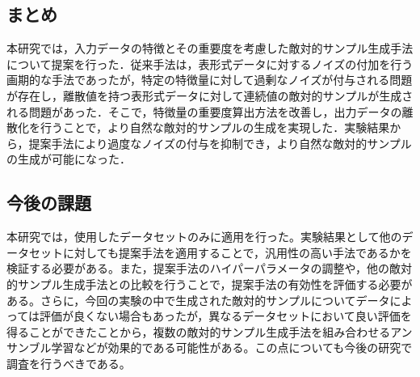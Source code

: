\subsection{まとめ}
本研究では，入力データの特徴とその重要度を考慮した敵対的サンプル生成手法について提案を行った．従来手法は，表形式データに対するノイズの付加を行う画期的な手法であったが，特定の特徴量に対して過剰なノイズが付与される問題が存在し，離散値を持つ表形式データに対して連続値の敵対的サンプルが生成される問題があった．そこで，特徴量の重要度算出方法を改善し，出力データの離散化を行うことで，より自然な敵対的サンプルの生成を実現した．実験結果から，提案手法により過度なノイズの付与を抑制でき，より自然な敵対的サンプルの生成が可能になった．
\subsection{今後の課題}
本研究では，使用したデータセットのみに適用を行った。実験結果として他のデータセットに対しても提案手法を適用することで，汎用性の高い手法であるかを検証する必要がある。また，提案手法のハイパーパラメータの調整や，他の敵対的サンプル生成手法との比較を行うことで，提案手法の有効性を評価する必要がある。さらに，今回の実験の中で生成された敵対的サンプルについてデータによっては評価が良くない場合もあったが，異なるデータセットにおいて良い評価を得ることができたことから，複数の敵対的サンプル生成手法を組み合わせるアンサンブル学習などが効果的である可能性がある。この点についても今後の研究で調査を行うべきである。
